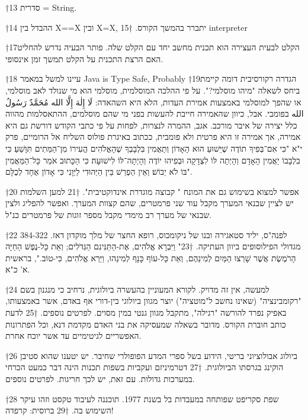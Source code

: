 †{13} סדרית = String.

†{14} ההבדל בין X==X ובין X=X, יתברר בהמשך הקורס.
†{15} interpreter

†{17}הקלט לבעית העצירה הוא תכנית מחשב יחד עם הקלט שלה. פותר הבעיה נדרש להחליט האם הרצת התכנית על הקלט תמשך זמן אינסופי.

†{18} עיינו למשל במאמר Java is Type Safe, Probably
†{19}הגדרה רקורסיבית דומה קיימת ביחס לשאלה "מיהו מוסלמי?". על פי ההלכה המוסלמית, מוסלמי הוא מי שנולד לאב מוסלמי, או שהפך למוסלמי באמצעות אמירת העדות, הלא היא השהאדה: لَا إِلٰهَ إِلَّا الله مُحَمَّدٌ رَسُولُ الله בפומבי. אבל, כיוון שהאמירה חייבת להעשות בפני מי שהם מוסלמים, ההתאסלמות מהווה כלל יצירה של איבר מורכב. אגב, ההמרה לנצרות, לפחות על פי כתבי הקודש דורשת גם היא אמירה, אך אמירה זו היא פרטית ולא פומבית, ככתוב באיגרת פולוס השליח אל הרומיים, פרק י"א "כִּי אִם־בְּפִיךָ תוֹדֶה שֶׁיֵּשׁוּעַ הוּא הָאָדוֹן וְתַאֲמִין בִּלְבָבְךָ שֶׁהָאֱלֹהִים הֱעִירוֹ מִן־הַמֵּתִים תִּוָּשֵׁעַ׃ כִּי בִלְבָבוֹ יַאֲמִין הָאָדָם וְהָיְתָה לּוֹ לִצְדָקָה וּבְפִיהוּ יוֹדֶה וְהָיְתָה־לּוֹ לִישׁוּעָה׃ כִּי הַכָּתוּב אֹמֵר כָּל־הַמַּאֲמִין בּוֹ לֹא יֵבוֹשׁ׃ וְאֵין הַפְרֵשׁ בֵּין הַיְּהוּדִי לַיְּוָנִי כִּי אָדוֹן אֶחָד לְכֻלָּם".

†{20} אפשר למצוא בשימוש גם את המונח " קבוצה מוגדרת אינדוקטיבית".
†{21} למען השלמות יש לציין שבנאי המערך מקבל עוד שני פרמטרים, שהם קצוות המערך. ואפשר להפליג ולצין שבנאי של מערך רב מימדי מקבל מספר זוגות של פרמטרים כנ"ל.

†{22} 384-322 לפנה"ס, יליד סטאגירה ובנו של ניקומכוס, רופא החצר של מלך מוקדון דאז. מגדולי הפילוסופים ביוון העתיקה.
†{23}" וַיִּבְרָא אֱלֹהִים, אֶת-הַתַּנִּינִם הַגְּדֹלִים; וְאֵת כָּל-נֶפֶשׁ הַחַיָּה הָרֹמֶשֶׂת אֲשֶׁר שָׁרְצוּ הַמַּיִם לְמִינֵהֶם, וְאֵת כָּל-עוֹף כָּנָף לְמִינֵהוּ, וַיַּרְא אֱלֹהִים, כִּי-טוֹב.", בראשית א' כ"א.

†{24} למעשה, אין זה מדויק. לקורא המעוניין בהעשרה ביולוגית, נרחיב כי מנגנון בשם "רקומבינציה" (שאינו נחשב ל"מוטציה") יוצר מגוון ביולוגי בין-דורי אף באדם, אשר באמצעותו, באפיק נפרד להורשה "רגילה", מתקבל מגוון גנטי במין מסוים. לפרטים נוספים.
†{25} לדעת כותב חוברת הקורס. מדובר בשאלה שמעסיקה את בני האדם מקדמת דנא, וכל הפתרונות האפשריים לגיטימיים עד אשר יוכח אחרת.

†{26} ביולוג אבולוציוני בריטי, הידוע בשל ספרי המדע הפופולרי שחיבר. יש יטענו שהוא סטיבן הוקינג בגרסתו הביולוגית.
†{27} דטרמיניזם ועקביות בשפות תכנות הינה דבר כמעט הכרחי במערכות גדולות. עם זאת, יש לכך חריגות. לפרטים נוספים.

†{28} שפת סקריפט שפותחה במעבדות בל בשנת 1977. תוכננה לעיבוד טקסט וזהו עיקר השימוש בה.
†{29} ברוסית: קרפדה!

